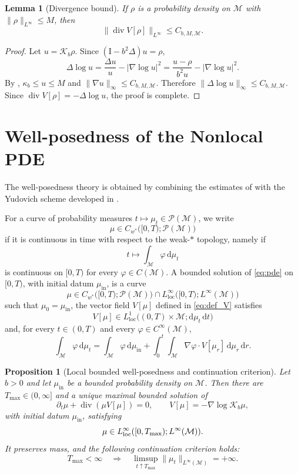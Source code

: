 \documentclass[11pt]{article}
\newtheorem{proposition}[theorem]{Proposition}
\newtheorem{lemma}[theorem]{Lemma}
\theoremstyle{definition}
\newcommand{\divg}{\operatorname{div}}
\def\M{\mathcal M}
\def\d{\mathrm{d}}
\def\I{\mathrm{I}}
\begin{document}
\begin{lemma}[Divergence bound]\label{lem:wellposed_divergence_bound}
If \(\rho\) is a probability density on  \(\M\) with \(\|\rho\|_{L^\infty}\le M\), then
\[
\|\divg V[\rho]\|_{L^\infty}\le C_{b,M,\M}.
\]
\end{lemma}

\begin{proof}
Let \(u=\mathcal K_b\rho\). Since \((\I-b^2\Delta)u=\rho\),
\begin{equation}\label{eq:short_chizat_G}
\Delta\log u
=
\frac{\Delta u}{u}-|\nabla\log u|^2
=
\frac{u-\rho}{b^2u}-|\nabla\log u|^2 .
\end{equation}
By , \(\kappa_b\le u\le M\) and
\(\|\nabla u\|_\infty\le C_{b,M,\M}\). Therefore
\(\|\Delta\log u\|_\infty\le C_{b,M,\M}\). Since
\(\divg V[\rho]=-\Delta\log u\), the proof is complete.
\end{proof}

\section{Well-posedness of the Nonlocal PDE}
\label{app:pde_wellposedness}


The well-posedness theory is obtained by combining the estimates of
 with the Yudovich scheme developed in
\cite[Section~2]{chizat2026quantitative_kmd}. 

For a curve of probability measures
\(t\mapsto\mu_t\in\mathcal P(\M)\), we write
\[
\mu\in C_{w^*}\bigl([0,T);\mathcal P(\M)\bigr)
\]
if it is continuous in time with respect to the weak-\(*\) topology, namely if
\[
t\longmapsto\int_\M\varphi\,\d\mu_t
\]
is continuous on \([0,T)\) for every \(\varphi\in C(\M)\).
A bounded solution of \eqref{eq:pde} on \([0,T)\), with initial datum
\(\mu_{\mathrm{in}}\), is a curve
\[
\mu\in
C_{w^*}\bigl([0,T);\mathcal P(\M)\bigr)
\cap
L^\infty_{\mathrm{loc}}\bigl([0,T);L^\infty(\M)\bigr)
\]
such that \(\mu_0=\mu_{\mathrm{in}}\), the vector field $V[\mu]$ defined in \eqref{eq:def_V} satisfies
\[
V[\mu]\in
L^1_{\mathrm{loc}}
\bigl((0,T)\times\M;\d\mu_t\,\d t\bigr)
\]
and, for every \(t\in(0,T)\) and every
\(\varphi\in C^\infty(\M)\),
\[
\int_\M\varphi\,\d\mu_t
=
\int_\M\varphi\,\d\mu_{\mathrm{in}}
+
\int_0^t\int_\M
\nabla\varphi\cdot V[\mu_r]\,\d\mu_r\,\d r.
\]

\begin{proposition}[Local bounded well-posedness and continuation criterion]\label{prop:pde_local_bounded_wellposedness}
Let \(b>0\) and let \(\mu_{\mathrm{in}}\) be a bounded probability density on
 \(\M\).
Then there are \(T_{\max}\in(0,\infty]\) and a unique maximal bounded
solution of
\[
\partial_t\mu+\divg(\mu V[\mu])=0,\qquad V[\mu]=-\nabla\log \mathcal K_b\mu,
\]
with initial datum \(\mu_{\mathrm{in}}\), satisfying
\[
\mu\in L^\infty_{\rm loc}([0,T_{\max});L^\infty( \M)).
\]
It preserves mass, and the following continuation criterion holds:
\[
T_{\max}<\infty
\quad\Longrightarrow\quad
\limsup_{t\uparrow T_{\max}}\|\mu_t\|_{L^\infty( \M)}=+\infty .
\]
\end{proposition}
\end{document}
